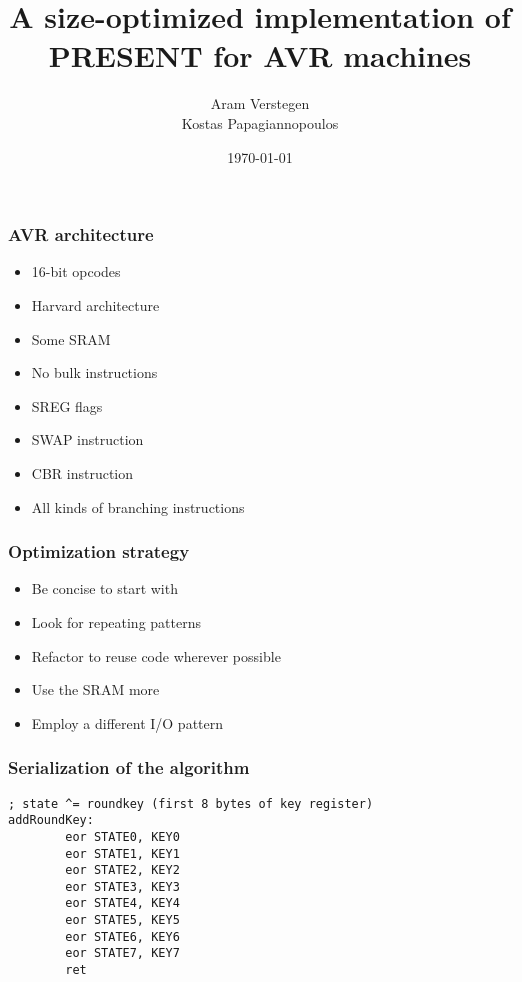 \documentclass{beamer}
\begin{document}
\title{A size-optimized implementation of PRESENT for AVR machines}
\author{
Aram Verstegen \\
Kostas Papagiannopoulos
}
\date{\today}

\frame{\titlepage}

\begin{frame}
\frametitle{AVR architecture}
        \begin{itemize}
        \item 16-bit opcodes
        \item Harvard architecture
        \item Some SRAM
        \item No bulk instructions
        \item SREG flags
        \item SWAP instruction
        \item CBR instruction
        \item All kinds of branching instructions
        \end{itemize}
\end{frame}

\begin{frame}
\frametitle{Optimization strategy}
        \begin{itemize}
        \item Be concise to start with
        \item Look for repeating patterns
        \item Refactor to reuse code wherever possible
        \item Use the SRAM more
        \item Employ a different I/O pattern
        \end{itemize}
\end{frame}

\begin{frame}[fragile]
\frametitle{Serialization of the algorithm}
\begin{lstlisting}
; state ^= roundkey (first 8 bytes of key register)
addRoundKey:
        eor STATE0, KEY0
        eor STATE1, KEY1
        eor STATE2, KEY2
        eor STATE3, KEY3
        eor STATE4, KEY4
        eor STATE5, KEY5
        eor STATE6, KEY6
        eor STATE7, KEY7
        ret
\end{lstlisting}
\end{frame}
\end{document}
